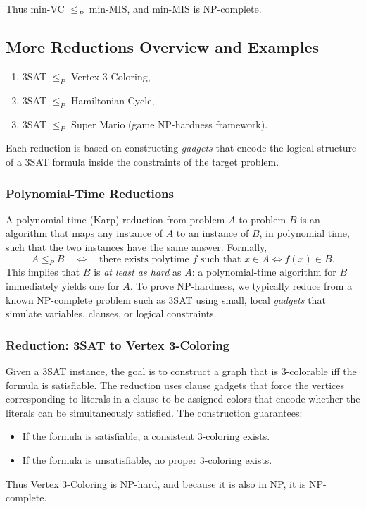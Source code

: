 \documentclass[9pt]{extarticle}
\begin{document}
Thus min-VC $\le_P$ min-MIS, and min-MIS is NP-complete.

\subsection{More Reductions Overview and Examples}
\begin{enumerate}
    \item 3SAT $\le_P$ Vertex 3-Coloring,
    \item 3SAT $\le_P$ Hamiltonian Cycle,
    \item 3SAT $\le_P$ Super Mario (game NP-hardness framework).
\end{enumerate}
Each reduction is based on constructing \emph{gadgets} that encode the logical
structure of a 3SAT formula inside the constraints of the target problem.

\subsubsection{Polynomial-Time Reductions}
A polynomial-time (Karp) reduction from problem $A$ to problem $B$ is an algorithm
that maps any instance of $A$ to an instance of $B$, in polynomial time, such that
the two instances have the same answer. Formally,
\[
A \le_P B \quad\Longleftrightarrow\quad
\text{there exists polytime } f \text{ such that }
x \in A \iff f(x) \in B.
\]
This implies that $B$ is \emph{at least as hard} as $A$: a polynomial-time algorithm
for $B$ immediately yields one for $A$. To prove NP-hardness, we typically reduce
from a known NP-complete problem such as 3SAT using small, local \emph{gadgets}
that simulate variables, clauses, or logical constraints.

\subsubsection{Reduction: 3SAT to Vertex 3-Coloring}
Given a 3SAT instance, the goal is to construct a graph that is 3-colorable iff
the formula is satisfiable. The reduction uses clause gadgets that force the
vertices corresponding to literals in a clause to be assigned colors that encode
whether the literals can be simultaneously satisfied.  
The construction guarantees:
\begin{itemize}
    \item If the formula is satisfiable, a consistent 3-coloring exists.
    \item If the formula is unsatisfiable, no proper 3-coloring exists.
\end{itemize}
Thus Vertex 3-Coloring is NP-hard, and because it is also in NP, it is NP-complete.
\end{document}
